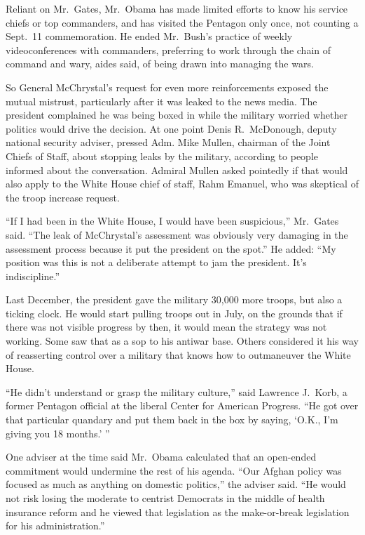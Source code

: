 ﻿\documentclass[12pt]{article}
\begin{document}
Reliant on Mr.~Gates, Mr.~Obama has made limited efforts to know his service chiefs or top
commanders, and has visited the Pentagon only once, not counting a Sept.~11 commemoration. He ended
Mr.~Bush's practice of weekly videoconferences with commanders, preferring to work through the chain
of command and wary, aides said, of being drawn into managing the wars.

So General McChrystal's request for even more reinforcements exposed the mutual mistrust,
particularly after it was leaked to the news media. The president complained he was being boxed in
while the military worried whether politics would drive the decision. At one point Denis
R.~McDonough, deputy national security adviser, pressed Adm. Mike Mullen, chairman of the Joint
Chiefs of Staff, about stopping leaks by the military, according to people informed about the
conversation. Admiral Mullen asked pointedly if that would also apply to the White House chief of
staff, Rahm Emanuel, who was skeptical of the troop increase request.

``If I had been in the White House, I would have been suspicious,'' Mr.~Gates said. ``The leak of
McChrystal's assessment was obviously very damaging in the assessment process because it put the
president on the spot.'' He added: ``My position was this is not a deliberate attempt to jam the
president. It's indiscipline.''

Last December, the president gave the military 30,000 more troops, but also a ticking clock. He
would start pulling troops out in July, on the grounds that if there was not visible progress by
then, it would mean the strategy was not working. Some saw that as a sop to his antiwar base. Others
considered it his way of reasserting control over a military that knows how to outmaneuver the White
House.

``He didn't understand or grasp the military culture,'' said Lawrence J.~Korb, a former Pentagon
official at the liberal Center for American Progress. ``He got over that particular quandary and put
them back in the box by saying, `O.K., I'm giving you 18 months.' ''

One adviser at the time said Mr.~Obama calculated that an open-ended commitment would undermine the
rest of his agenda. ``Our Afghan policy was focused as much as anything on domestic politics,'' the
adviser said. ``He would not risk losing the moderate to centrist Democrats in the middle of health
insurance reform and he viewed that legislation as the make-or-break legislation for his
administration.''
\end{document}
